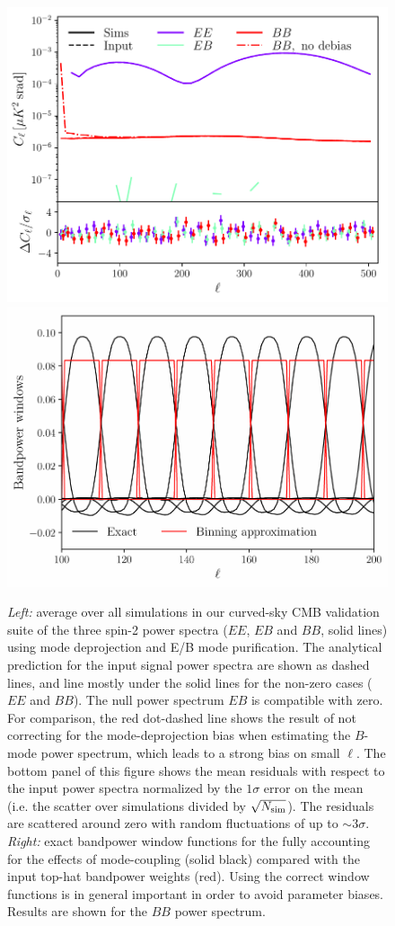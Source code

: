 \documentclass[usenatbib]{mnrasb}
\begin{document}
      \begin{figure}
        \centering
        \includegraphics[width=0.99\columnwidth]{val_cl_cmb_sph}
        \includegraphics[width=0.99\columnwidth]{val_cmb_bpw}
        \caption{{\sl Left:} average over all simulations in our
          curved-sky CMB validation suite of the three spin-2 power
          spectra ($EE$, $EB$ and $BB$, solid lines) using mode
          deprojection and E/B mode purification. The analytical prediction for the input signal power spectra are shown as dashed lines, and line mostly under the solid lines for the non-zero cases ($EE$ and $BB$). The null power spectrum $EB$ is compatible with zero. For comparison, the red dot-dashed line shows the result of not correcting for the mode-deprojection bias when estimating the $B$-mode power spectrum, which leads to a strong bias on small $\ell$. The bottom panel of this figure shows the mean residuals with respect to the input power spectra normalized by the $1\sigma$ error on the mean (i.e. the scatter over simulations divided by $\sqrt{N_{\rm sim}}$). The residuals are scattered around zero with random fluctuations of up to $\sim3\sigma$. {\sl Right:} exact bandpower window functions for the fully accounting for the effects of mode-coupling (solid black) compared with the input top-hat bandpower weights (red). Using the correct window functions is in general important in order to avoid parameter biases. Results are shown for the $BB$ power spectrum.} \label{fig:cmb_val_cls}

\end{figure}
\end{document}
